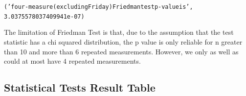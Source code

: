 \documentclass[letterpaper,10pt,english]{/Users/edwsurewin/anaconda/lib/python2.7/site-packages/sphinx/texinputs/sphinxhowto}
\newenvironment{InvisibleVerbatim}
        {\begin{mdframed}[leftmargin=0.1\linewidth,innerleftmargin=3pt,innerrightmargin=3pt, userdefinedwidth=1\linewidth, linewidth=0pt, linecolor=white, usetwoside=false]}
        {\end{mdframed}}
\begin{document}
    

        
        

            
                \begin{InvisibleVerbatim}
                \vspace{-0.5\baselineskip}
\begin{alltt}('four-measure (excluding Friday) Friedman test p-value is',
3.0375578037409941e-07)
\end{alltt}

            \end{InvisibleVerbatim}
            
        
    
The limitation of Friedman Test is that, due to the assumption that the
test statistic has a chi squared distribution, the p value is only
reliable for n greater than 10 and more than 6 repeated measurements.
However, we only as well as could at most have 4 repeated measurements.\subsection{Statistical Tests Result
Table}\label{statistical-tests-result-table}

\end{document}
